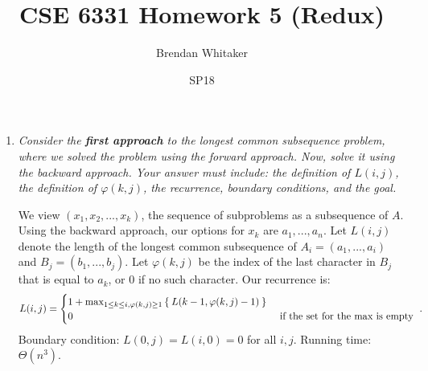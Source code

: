 \documentclass[10pt,oneside,reqno]{amsart}
\theoremstyle{plain}
\theoremstyle{definition}
\theoremstyle{remark}
\newcommand{\bee}{\begin{equation}\begin{aligned}}
\newcommand{\eee}{\end{aligned}\end{equation}}
\renewcommand{\phi}{\varphi}
\begin{document}
\title{CSE 6331 Homework 5 (Redux)}

\date{SP18}

\author[Brendan Whitaker]{Brendan Whitaker}

\maketitle



\begin{enumerate}[label=\arabic*.]
\item \textit{Consider the \textbf{first approach} to the longest common subsequence problem, where we solved the problem using the forward approach. Now, solve it using the backward approach. Your answer must include: the definition of $L(i,j)$, the definition of $\phi(k,j)$, the recurrence, boundary conditions, and the goal. }

We view $(x_1,x_2,...,x_k)$, the sequence of subproblems as a subsequence of $A$. Using the backward approach, our options for $x_k$ are $a_1,...,a_n$. Let $L(i,j)$ denote the length of the longest common subsequence of $A_i = (a_1,...,a_i)$ and $B_j = (b_1,...,b_j)$. Let $\phi(k,j)$ be the index of the last character in $B_j$ that is equal to $a_k$, or $0$ if no such character. Our recurrence is:
\bee
L(i,j) = \begin{cases}
1 + \max_{1 \leq k \leq i,
\phi(k,j) \geq 1}\Set{L(k - 1,\phi(k,j) - 1)}\\
0 & \text{ if the set for the max is empty }
\end{cases}. 
\eee
Boundary condition: $L(0,j) = L(i,0) = 0$ for all $i,j$. 
Running time: $\Theta(n^3)$. 


\end{enumerate}
\end{document}
